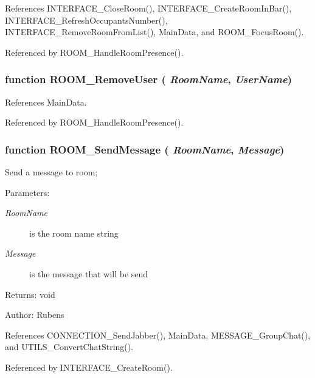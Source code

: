 References INTERFACE\_\-CloseRoom(), INTERFACE\_\-CreateRoomInBar(), INTERFACE\_\-RefreshOccupantsNumber(), INTERFACE\_\-RemoveRoomFromList(), MainData, and ROOM\_\-FocusRoom().

Referenced by ROOM\_\-HandleRoomPresence().
\subsubsection{\setlength{\rightskip}{0pt plus 5cm}function ROOM\_\-RemoveUser ( {\em RoomName}, \/   {\em UserName})}\label{room_2room_8js_3fe1367cac303f84c7205a72319fd60f}




References MainData.

Referenced by ROOM\_\-HandleRoomPresence().
\subsubsection{\setlength{\rightskip}{0pt plus 5cm}function ROOM\_\-SendMessage ( {\em RoomName}, \/   {\em Message})}\label{room_2room_8js_826f57caabe7d468297581a021fa17ef}


Send a message to room;

\begin{Desc}
\item[Parameters:]
\begin{description}
\item[{\em RoomName}]is the room name string \item[{\em Message}]is the message that will be send \end{description}
\end{Desc}
\begin{Desc}
\item[Returns:]void \end{Desc}
\begin{Desc}
\item[Author:]Rubens \end{Desc}


References CONNECTION\_\-SendJabber(), MainData, MESSAGE\_\-GroupChat(), and UTILS\_\-ConvertChatString().

Referenced by INTERFACE\_\-CreateRoom().
